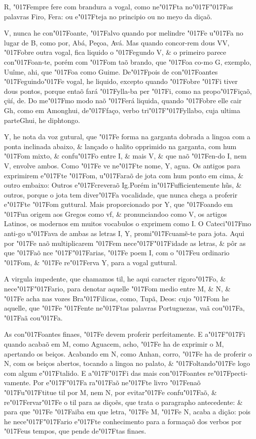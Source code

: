 \documentclass[openany,titlepage,12pt]{book}
\newcommand{\lgS}{\char"017F}
\newcommand{\lgSS}{\char"017F\char"017F}
\begin{document}
R, \lgS empre fere com brandura a vogal, como ne\lgS ta no\lgSS as
palavras Firo, Fera: ou e\lgS teja no principio ou no meyo da diçaõ.

V, nunca he con\lgS oante, \lgS alvo quando por melindre \lgS e 
u\lgS a no lugar de B, como por, Abá, Peçoa, Avá. Mas quando
concor-rem dous VV, \lgS obre outra vogal, fica liquido o 
\lgS egundo V, \& o primeiro parece con\lgS oan-te, porém com
\lgS om taõ brando, que \lgS oa co-mo G, exemplo, Uuîme, ahi, que
\lgS oa como Guime. De\lgS pois de con\lgS oantes 
\lgS eguindo\lgS e vogal, he liquido, excepto quando
\lgS obre \lgS i tiver dous pontos, porque entaõ fará
\lgS ylla-ba per \lgS i, como na propo\lgS içaõ, çüí, de.
Do me\lgS mo modo naõ \lgS erá liquida, quando \lgS obre
elle cair Gh, como em Amonghui, de\lgS faço, verbo
tri\lgSS yllabo, cuja ultima parte\linebreak Ghui, he diphtongo.

Y, he nota da voz gutural, que \lgS e forma na garganta dobrada a
lingoa com a ponta inclinada abaixo, \& lançado o halito opprimido
na garganta, com hum \lgS om mixto, \& confu\lgS o entre I, \& mais
V, \& que naõ \lgS en-do I, nem V, envolve ambos. Como \lgS e ve 
ne\lgS te nome, Y, agua. Os antigos para exprimirem e\lgS te \lgS om,
u\lgS araõ de jota com hum ponto em cima, \& outro embaixo: Outros
e\lgS creveraõ Ig.Porém in\lgS ufficientemente hũs, \& outros, porque
o jota tem diver\lgS a vocalidade, que nunca chega a proferir 
e\lgS te \lgS om guttural. Mais proporcionado por Y, que \lgS oando
em \lgS ua origem aos Gregos como vf, \& pronunciandoo como V,
os artigos Latinos, os modernos em muitos vocabulos o exprimem como
I. O Cateci\lgS mo anti-go u\lgS ava de ambas as letras I, Y, 
promi\lgS cuamẽ-te para jota. Aqui por \lgS e naõ multiplicarem
\lgS em nece\lgSS idade as letras, \& pôr as que \lgS aõ 
nce \lgSS arias, \lgS e poem I, com o \lgS eu ordinario 
\lgS om, \& \lgS e re\lgS erva Y, para a vogal guttural.

A virgula impedente, que chamamos til, he aqui caracter rigoro\lgS o,
\& nece\lgSS ario, para denotar aquelle \lgS om medio entre M, \& N,
\& \lgS e acha nas vozes Bra\lgS ilicas, como, Tupã, Deos: cujo
\lgS om he aquelle, que \lgS e \lgS ente ne\lgS tas palavras 
Portuguezas, vaã cou\lgS a, \lgS aã cou\lgS a.

As con\lgS oantes finaes, \lgS e devem proferir perfeitamente. E 
a\lgSS i quando acabaõ em M, como Aguacem, acho, \lgS e ha de 
exprimir o M, apertando os beiços. Acabando em N, como Anhan, corro,
\lgS e ha de proferir o N, com os beiços abertos, tocando a lingoa
no palato, \& \lgS oltando\lgS e logo com algum e\lgS talido. E
a\lgSS i das mais con\lgS oantes re\lgS pecti-vamente. Por e\lgSS a
ra\lgS aõ ne\lgS te livro \lgS enaõ\linebreak
\lgS u\lgS titue til por M, nem N,
por evitar\lgS e confu\lgS aõ, \& re\lgS ervar\lgS e o til para as
diçoẽs, que trata o paragrapho antecedente: \& para\linebreak
que \lgS e \lgS aiba em que letra,
\lgS e M, \lgS e N, acaba a dição: pois he
nece\lgSS ario e\lgS te conhecimento para
a formaçaõ dos verbos por \lgS eus tempos,
 que pende de\lgS tas finaes.
\end{document}
